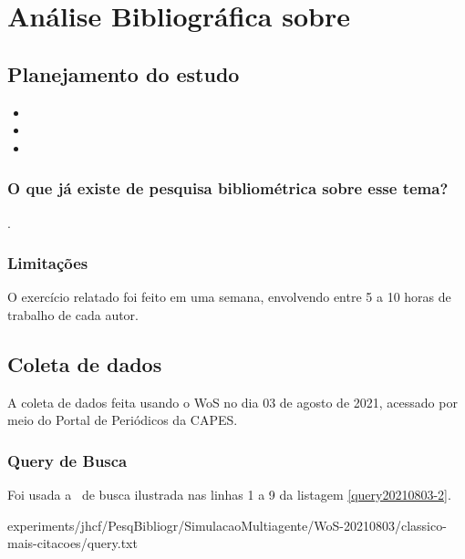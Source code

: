 \chapter{Análise Bibliográfica sobre\label{chap:bibliometria:}}

\section{Planejamento do estudo\label{}}

 
 

\begin{itemize}
    \item 
    \item 
    \item 
\end{itemize}

\subsection{O que já existe de pesquisa bibliométrica sobre esse tema?}

\cite{} 
\cite{}.


\subsection{Limitações} O exercício relatado foi feito em uma semana, envolvendo entre 5 a 10 horas de trabalho de cada autor.

\section{Coleta de dados\label{MASSA:coleta}}

A coleta de dados feita usando o WoS no dia 03 de agosto de 2021, acessado por meio do Portal de Periódicos da CAPES.


\subsection{Query de Busca}

Foi usada a \query\  de busca ilustrada nas linhas 1 a 9 da listagem \ref{query20210803-2}.


{experiments/jhcf/PesqBibliogr/SimulacaoMultiagente/WoS-20210803/classico-mais-citacoes/query.txt}

